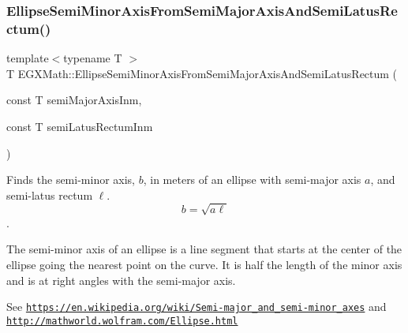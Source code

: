 \mbox{\label{group___e_g_x_math-_geometry-2_d-_ellipse-_semi_minor_axis_gaed84cd29b0768dd8eb2628b69e5c163f}} 
\subsubsection{\texorpdfstring{Ellipse\+Semi\+Minor\+Axis\+From\+Semi\+Major\+Axis\+And\+Semi\+Latus\+Rectum()}{EllipseSemiMinorAxisFromSemiMajorAxisAndSemiLatusRectum()}}
{\footnotesize\ttfamily template$<$typename T $>$ \\
T E\+G\+X\+Math\+::\+Ellipse\+Semi\+Minor\+Axis\+From\+Semi\+Major\+Axis\+And\+Semi\+Latus\+Rectum (\begin{DoxyParamCaption}\item[{const T}]{semi\+Major\+Axis\+Inm,  }\item[{const T}]{semi\+Latus\+Rectum\+Inm }\end{DoxyParamCaption})}



Finds the semi-\/minor axis, $b$, in meters of an ellipse with semi-\/major axis $a$, and semi-\/latus rectum $\ell$. \[ b= \sqrt{a\ell} \]. 

The semi-\/minor axis of an ellipse is a line segment that starts at the center of the ellipse going the nearest point on the curve. It is half the length of the minor axis and is at right angles with the semi-\/major axis.

See \href{https://en.wikipedia.org/wiki/Semi-major_and_semi-minor_axes}{\tt https\+://en.\+wikipedia.\+org/wiki/\+Semi-\/major\+\_\+and\+\_\+semi-\/minor\+\_\+axes} and \href{http://mathworld.wolfram.com/Ellipse.html}{\tt http\+://mathworld.\+wolfram.\+com/\+Ellipse.\+html}


